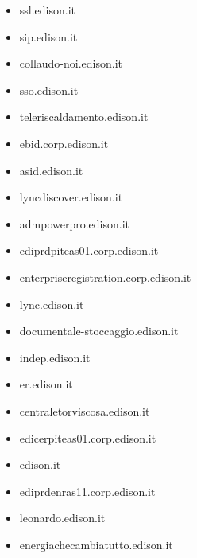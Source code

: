 \documentclass{article}
\begin{document}
\begin{itemize}
            \item ssl.edison.it
        
            \item sip.edison.it
        
            \item collaudo-noi.edison.it
        
            \item sso.edison.it
        
            \item teleriscaldamento.edison.it
        
            \item ebid.corp.edison.it
        
            \item asid.edison.it
        
            \item lyncdiscover.edison.it
        
            \item admpowerpro.edison.it
        
            \item ediprdpiteas01.corp.edison.it
        
            \item enterpriseregistration.corp.edison.it
        
            \item lync.edison.it
        
            \item documentale-stoccaggio.edison.it
        
            \item indep.edison.it
        
            \item er.edison.it
        
            \item centraletorviscosa.edison.it
        
            \item edicerpiteas01.corp.edison.it
        
            \item edison.it
        
            \item ediprdenras11.corp.edison.it
        
            \item leonardo.edison.it
        
            \item energiachecambiatutto.edison.it
        

\end{itemize}
\end{document}
